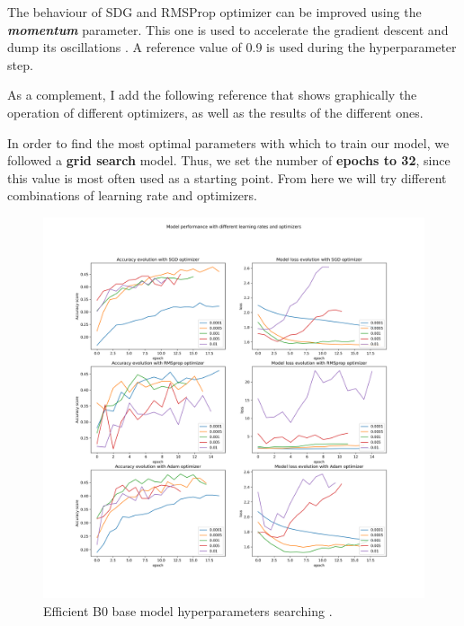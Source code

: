 \begin{enumerate}
    The behaviour of SDG and RMSProp optimizer can be improved using the \textit{\textbf{momentum}} parameter. This one is used to accelerate the gradient descent and dump its oscillations \cite{SGDwithMomentum}. A reference value of 0.9 is used during the hyperparameter step.

    As a complement, I add the following reference \cite{optimizers1} that shows graphically the operation of different optimizers, as well as the results of the different ones. 

    In order to find the most optimal parameters with which to train our model, we followed a \textbf{grid search} model. Thus, we set the number of \textbf{epochs to 32}, since this value is most often used as a starting point. From here we will try different combinations of learning rate and optimizers.

\end{enumerate}

\begin{figure}[ht]
    \begin{center}
        \includegraphics[scale=0.35]{images/Building/Hyperparameters/Model performance with different learning rates and optimizers.png}
        \caption{Efficient B0 base model hyperparameters searching .}
    \label{fig: EfficientB0_hyperparameters}    
    \end{center}
\end{figure}

